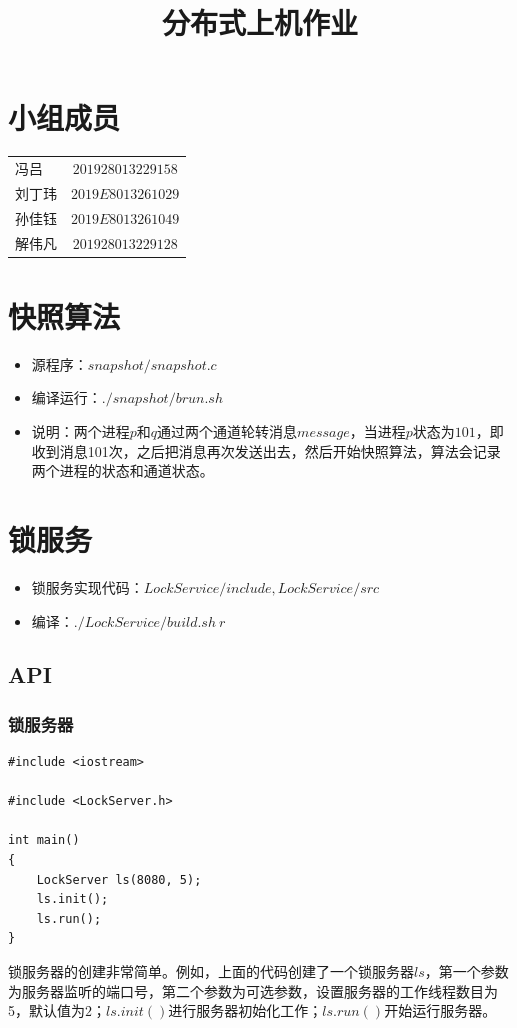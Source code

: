\documentclass{ctexart}
\title{分布式上机作业}
\author{}
\date{}
\begin{document}
\maketitle
{}


\section{小组成员}
  \begin{tabular}{lc}
	冯吕 & $201928013229158$\\
	刘丁玮 & $2019E8013261029$\\
	孙佳钰 & $2019E8013261049$\\
	解伟凡 & $201928013229128$
\end{tabular}

\section{快照算法}
\begin{itemize}
  \item  源程序：$snapshot/snapshot.c$
  \item 编译运行：$./snapshot/brun.sh$
	\item 说明：两个进程$p$和$q$通过两个通道轮转消息$message$，当进程$p$状态为$101$，即收到消息101次，之后把消息再次发送出去，然后开始快照算法，算法会记录两个进程的状态和通道状态。
\end{itemize}

\section{锁服务}
\begin{itemize}
  \item 锁服务实现代码：$LockService/include, LockService/src$
  \item 编译：$./LockService/build.sh\ r$
\end{itemize}

\subsection{API}
\subsubsection{锁服务器}
\begin{lstlisting}
#include <iostream>

#include <LockServer.h>

int main()
{
    LockServer ls(8080, 5);
    ls.init();
    ls.run();
}
\end{lstlisting}
锁服务器的创建非常简单。例如，上面的代码创建了一个锁服务器$ls$，第一个参数为服务器监听的端口号，第二个参数为可选参数，设置服务器的工作线程数目为5，默认值为$2$；$ls.init()$进行服务器初始化工作；$ls.run()$开始运行服务器。
\end{document}
